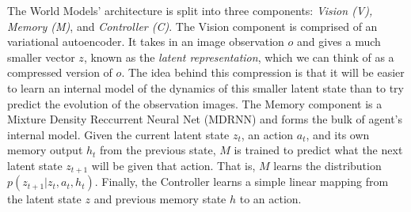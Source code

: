 \documentclass{article}
\theoremstyle{definition}
\begin{document}
The World Models' architecture is split into three components: \textit{Vision (V), Memory (M)}, and \textit{Controller (C)}.
The Vision component is comprised of an variational autoencoder.
It takes in an image observation $o$ and gives a much smaller vector $z$, known as the \textit{latent representation}, which we can think of as a compressed version of $o$.
The idea behind this compression is that it will be easier to learn an internal model of the dynamics of this smaller latent state than to try predict the evolution of the observation images. 
The Memory component is a Mixture Density Reccurrent Neural Net (MDRNN) and forms the bulk of agent's internal model.
Given the current latent state $z_t$, an action $a_t$, and its own memory output $h_{t}$ from the previous state, $M$ is trained to predict what the next latent state $z_{t+1}$ will be given that action.
That is, $M$ learns the distribution $p(z_{t+1} | z_t, a_t, h_t)$.
Finally, the Controller learns a simple linear mapping from the latent state $z$ and previous memory state $h$ to an action. 
\end{document}
